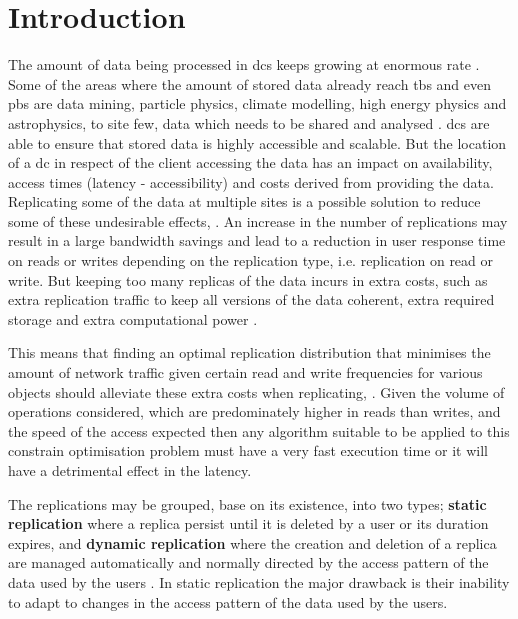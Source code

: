 \documentclass{acm_proc_article-sp}
\begin{document}
\section{Introduction}
	The amount of data being processed in \glspl{dc} keeps growing at enormous rate \cite{Tolle2011a, Cisco2014a, Chanthadavong2014a}. Some of the areas where the amount of stored data already reach \glspl{tb} and even \glspl{pb} are data mining, particle physics, climate modelling, high energy physics and astrophysics, to site few, data which needs to be shared and analysed \cite{KingsyGrace2013a, MohdZin2012a, Naseera2009a}. \glspl{dc} are able to ensure that stored data is highly accessible and scalable. But the location of a \gls{dc} in respect of the client accessing the data has an impact on availability, access times (latency - accessibility) and costs derived from providing the data. Replicating some of the data at multiple sites is a possible solution to reduce some of these undesirable effects, \cite{Briquemont2014a, Abad2011a, Venugopal2006a}. An increase in the number of replications may result in a large bandwidth savings and lead to a reduction in user response time on reads or writes depending on the replication type, i.e. replication on read or write. But keeping too many replicas of the data incurs in extra costs, such as extra replication traffic to keep all versions of the data coherent, extra required storage and extra computational power \cite{Serrano2007a, Goel2006a}.
	
	This means that finding an optimal replication distribution that minimises the amount of network traffic given certain read and write frequencies for various objects should alleviate these extra costs when replicating, \cite{Wolfson1990a, Briquemont2014a}. Given the volume of operations considered, which are predominately higher in reads than writes, and the speed of the access expected then any algorithm suitable to be applied to this constrain optimisation problem must have a very fast execution time or it will have a detrimental effect in the latency.

	The replications may be grouped, base on its existence, into two types; {\bf static replication} where a replica persist until it is deleted by a user or its duration expires, and {\bf dynamic replication} where the creation and deletion of a replica are managed automatically and normally directed by the access pattern of the data used by the users \cite{Dong2008a}. In static replication the major drawback is their inability to adapt to changes in the access pattern of the data used by the users.
	
\end{document}
